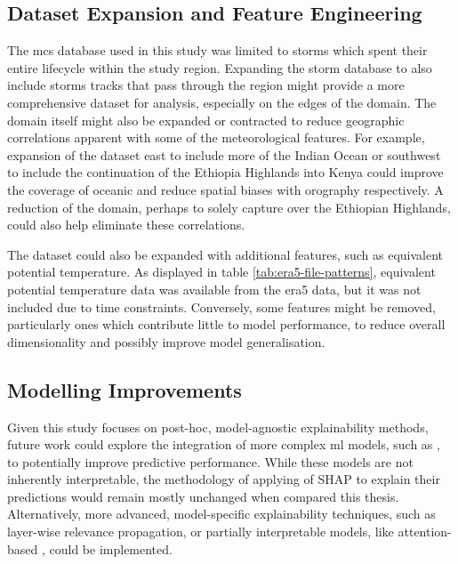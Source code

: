 \subsection{Dataset Expansion and Feature Engineering}

The \acrshort{mcs} database used in this study was limited to storms which spent their entire lifecycle within the study region. Expanding the storm database to also include storms tracks that pass through the region might provide a more comprehensive dataset for analysis, especially on the edges of the domain. The domain itself might also be expanded or contracted to reduce geographic correlations apparent with some of the meteorological features. For example, expansion of the dataset east to include more of the Indian Ocean or southwest to include the continuation of the Ethiopia Highlands into Kenya could improve the coverage of oceanic  and reduce spatial biases with orography respectively. A reduction of the domain, perhaps to solely capture  over the Ethiopian Highlands, could also help eliminate these correlations.

The dataset could also be expanded with additional features, such as equivalent potential temperature. As displayed in table \ref{tab:era5-file-patterns}, equivalent potential temperature data was available from the \acrshort{era5} data, but it was not included due to time constraints. Conversely, some features might be removed, particularly ones which contribute little to model performance, to reduce overall dimensionality and possibly improve model generalisation.

\subsection{Modelling Improvements}

Given this study focuses on post-hoc, model-agnostic explainability methods, future work could explore the integration of more complex \acrshort{ml} models, such as , to potentially improve predictive performance. While these models are not inherently interpretable, the methodology of applying of SHAP to explain their predictions would remain mostly unchanged when compared this thesis. Alternatively, more advanced, model-specific explainability techniques, such as layer-wise relevance propagation, or partially interpretable models, like attention-based , could be implemented.
